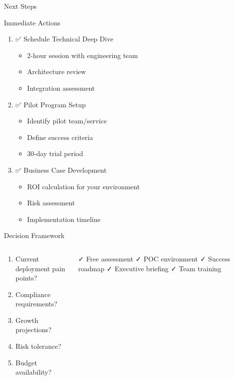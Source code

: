 \documentclass[presentation,aspectratio=169]{beamer}
\begin{document}
\begin{frame}[label={sec:orge68afa7}]{Next Steps}
\begin{block}{Immediate Actions}
\begin{enumerate}[<+->]
\item ✅ \alert{Schedule Technical Deep Dive}
\begin{itemize}
\item 2-hour session with engineering team
\item Architecture review
\item Integration assessment
\end{itemize}

\item ✅ \alert{Pilot Program Setup}
\begin{itemize}
\item Identify pilot team/service
\item Define success criteria
\item 30-day trial period
\end{itemize}

\item ✅ \alert{Business Case Development}
\begin{itemize}
\item ROI calculation for your environment
\item Risk assessment
\item Implementation timeline
\end{itemize}
\end{enumerate}
\end{block}
\begin{block}{Decision Framework}
\begin{columns}
\begin{column}{0.5\columnwidth}
\begin{enumerate}
\item Current deployment pain points?
\item Compliance requirements?
\item Growth projections?
\item Risk tolerance?
\item Budget availability?
\end{enumerate}
\end{column}
\begin{column}{0.5\columnwidth}
✓ Free assessment
✓ POC environment
✓ Success roadmap
✓ Executive briefing
✓ Team training
\end{column}
\end{columns}
\end{block}
\end{frame}
\end{document}
